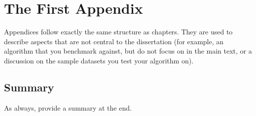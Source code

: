 
\chapter{The First Appendix}
\label{app:appendix1}


Appendices follow exactly the same structure as chapters. They are used to describe aspects that are not central to the dissertation (for example, an algorithm that you benchmark against, but do not focus on in the main text, or a discussion on the sample datasets you test your algorithm on).


\section{Summary}
\label{sec:appendix1:summary}

As always, provide a summary at the end.


